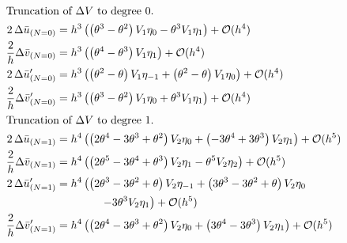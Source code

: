 \begin{align*}
    \intertext{Truncation of $\Delta V$ to degree $0$.}
    2\,\Delta \bar{u}_{(N=0)}          & = h^{3}\left(\left(\theta^{3} - \theta^{2}\right) V_{1} \eta_{0} -\theta^{3} V_{1} \eta_{1}\right) + \mathcal{O}(h^{4})                                                                    \\
    \frac{2}{h}\Delta \bar{v}_{(N=0)}  & = h^{3}\left(\left(\theta^{4} - \theta^{3}\right) V_{1} \eta_{1}\right) + \mathcal{O}(h^{4})                                                                                               \\
    2\,\Delta \bar{u}'_{(N=0)}         & = h^{3}\left(\left(\theta^{2} - \theta\right) V_{1} \eta_{-1} + \left(\theta^{2} - \theta\right) V_{1} \eta_{0}\right) + \mathcal{O}(h^{4})                                                \\
    \frac{2}{h}\Delta \bar{v}'_{(N=0)} & = h^{3}\left(\left(\theta^{3} - \theta^{2}\right) V_{1} \eta_{0} + \theta^{3} V_{1} \eta_{1}\right) + \mathcal{O}(h^{4})                                                                   \\
    \intertext{Truncation of $\Delta V$ to degree $1$.}
    2\,\Delta \bar{u}_{(N=1)}          & = h^{4}\left(\left(2 \theta^{4} - 3 \theta^{3} + \theta^{2}\right) V_{2} \eta_{0} + \left(-3 \theta^{4} + 3 \theta^{3}\right) V_{2} \eta_{1}\right) + \mathcal{O}(h^{5})                   \\
    \frac{2}{h}\Delta \bar{v}_{(N=1)}  & = h^{4}\left(\left(2 \theta^{5} - 3 \theta^{4} + \theta^{3}\right) V_{2} \eta_{1} - \theta^{5} V_{2} \eta_{2}\right) + \mathcal{O}(h^{5})                                                  \\
    2\,\Delta \bar{u}'_{(N=1)}         & = h^{4}\left(\left(2 \theta^{3} - 3 \theta^{2} + \theta\right) V_{2} \eta_{-1} + \left(3 \theta^{3} - 3 \theta^{2} + \theta\right) V_{2} \eta_{0} \right.                                  \\
                                       & \qquad\qquad \left. - 3 \theta^{3} V_{2} \eta_{1}\right) + \mathcal{O}(h^{5})                                                                                                              \\
    \frac{2}{h}\Delta \bar{v}'_{(N=1)} & = h^{4}\left(\left(2 \theta^{4} - 3 \theta^{3} + \theta^{2}\right) V_{2} \eta_{0} + \left(3 \theta^{4} - 3 \theta^{3}\right) V_{2} \eta_{1}\right) + \mathcal{O}(h^{5})                    \\

\end{align*}

